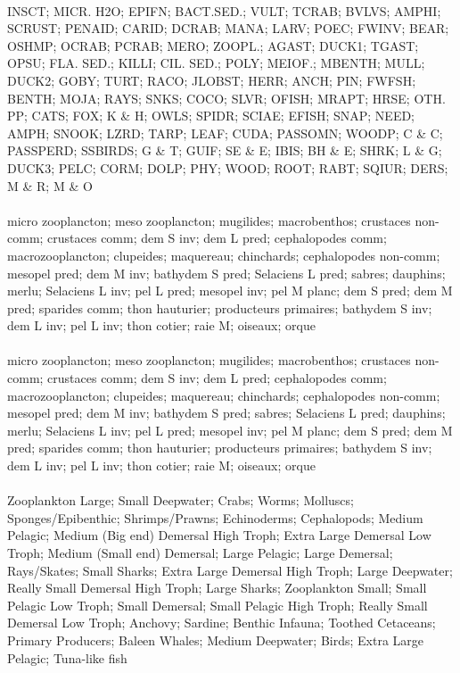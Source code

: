 \fullhline
\hline
{} \\
\hline
INSCT; MICR. H2O; EPIFN; BACT.SED.; VULT; TCRAB; BVLVS; AMPHI; SCRUST; PENAID; CARID; DCRAB; MANA; LARV; POEC; FWINV; BEAR; OSHMP; OCRAB; PCRAB; MERO; ZOOPL.; AGAST; DUCK1; TGAST; OPSU; FLA. SED.; KILLI; CIL. SED.; POLY; MEIOF.; MBENTH; MULL; DUCK2; GOBY; TURT; RACO; JLOBST; HERR; ANCH; PIN; FWFSH; BENTH; MOJA; RAYS; SNKS; COCO; SLVR; OFISH; MRAPT; HRSE; OTH. PP; CATS; FOX; K \& H; OWLS; SPIDR; SCIAE; EFISH; SNAP; NEED; AMPH; SNOOK; LZRD; TARP; LEAF; CUDA; PASSOMN; WOODP; C \& C; PASSPERD; SSBIRDS; G \& T; GUIF; SE \& E; IBIS; BH \& E; SHRK; L \& G; DUCK3; PELC; CORM; DOLP; PHY; WOOD; ROOT; RABT; SQIUR; DERS; M \& R; M \& O\\
\fullhline
\hline
{} \\
\hline
micro zooplancton; meso zooplancton; mugilides; macrobenthos; crustaces non-comm; crustaces comm; dem S inv; dem L pred; cephalopodes comm; macrozooplancton; clupeides; maquereau; chinchards; cephalopodes non-comm; mesopel pred; dem M inv; bathydem S pred; Selaciens L pred; sabres; dauphins; merlu; Selaciens L inv; pel L pred; mesopel inv; pel M planc; dem S pred; dem M pred; sparides comm; thon hauturier; producteurs primaires; bathydem S inv; dem L inv; pel L inv; thon cotier; raie M; oiseaux; orque\\
\fullhline
\hline
{} \\
\hline
micro zooplancton; meso zooplancton; mugilides; macrobenthos; crustaces non-comm; crustaces comm; dem S inv; dem L pred; cephalopodes comm; macrozooplancton; clupeides; maquereau; chinchards; cephalopodes non-comm; mesopel pred; dem M inv; bathydem S pred; sabres; Selaciens L pred; dauphins; merlu; Selaciens L inv; pel L pred; mesopel inv; pel M planc; dem S pred; dem M pred; sparides comm; thon hauturier; producteurs primaires; bathydem S inv; dem L inv; pel L inv; thon cotier; raie M; oiseaux; orque\\
\fullhline
\hline
{} \\
\hline
Zooplankton Large; Small Deepwater; Crabs; Worms; Molluscs; Sponges/Epibenthic; Shrimps/Prawns; Echinoderms; Cephalopods; Medium Pelagic; Medium (Big end) Demersal  High Troph; Extra Large Demersal Low Troph; Medium (Small end) Demersal; Large Pelagic; Large Demersal; Rays/Skates; Small Sharks; Extra Large Demersal High Troph; Large Deepwater; Really Small Demersal High Troph; Large Sharks; Zooplankton Small; Small Pelagic Low Troph; Small Demersal; Small Pelagic High Troph; Really Small Demersal Low Troph; Anchovy; Sardine; Benthic Infauna; Toothed Cetaceans; Primary Producers; Baleen Whales; Medium Deepwater; Birds; Extra Large Pelagic; Tuna-like fish\\
